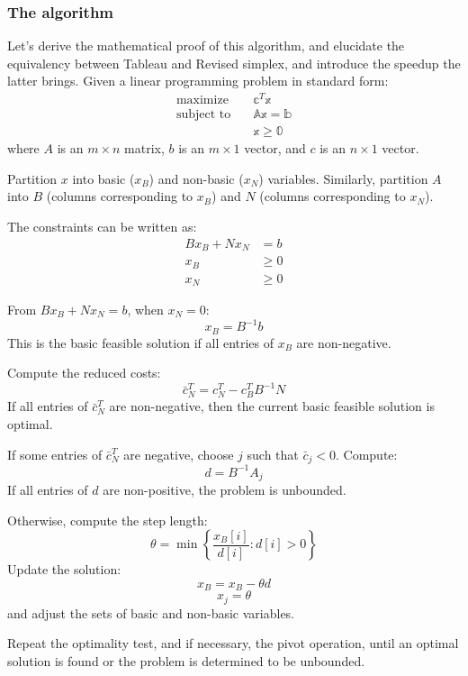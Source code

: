 \subsubsection*{The algorithm}
Let's derive the mathematical proof of this algorithm, and elucidate the
equivalency between Tableau and Revised simplex, and introduce the
speedup the latter brings.
Given a linear programming problem in standard form:
\begin{align*}
    \text{maximize} \quad   & \mathbb{c}^T \mathbb{x}    \\
    \text{subject to} \quad & \mathbb{A}\mathbb{x} = \mathbb{b}   \\
                            & \mathbb{x} \geq \mathbb{0}
\end{align*}
where \( A \) is an \( m \times n \) matrix,
\( b \) is an \( m \times 1 \) vector, and
\( c \) is an \( n \times 1 \) vector.


Partition \( x \) into basic (\( x_B \)) and non-basic (\( x_N \)) variables.
Similarly, partition \( A \) into \( B \) (columns corresponding to \( x_B \))
and \( N \) (columns corresponding to \( x_N \)).

The constraints can be written as:
\begin{align*}
    Bx_B + Nx_N & = b    \\
    x_B         & \geq 0 \\
    x_N         & \geq 0
\end{align*}

From \( Bx_B + Nx_N = b \), when \( x_N = 0 \):
\[ x_B = B^{-1}b \]
This is the basic feasible solution if all entries of \( x_B \) are non-negative.

Compute the reduced costs:
\[ \bar{c}_N^T = c_N^T - c_B^T B^{-1} N \]
If all entries of \( \bar{c}_N^T \) are non-negative,
then the current basic feasible solution is optimal.

If some entries of \( \bar{c}_N^T \) are negative,
choose \( j \) such that \( \bar{c}_j < 0 \). Compute:
\[ d = B^{-1} A_j \]
If all entries of \( d \) are non-positive, the problem is unbounded.

Otherwise, compute the step length:
\[ \theta = \min \left\{ \frac{x_B[i]}{d[i]} : d[i] > 0 \right\} \]
Update the solution:
\[ x_B = x_B - \theta d \]
\[ x_j = \theta \]
and adjust the sets of basic and non-basic variables.

Repeat the optimality test, and if necessary, the pivot operation,
until an optimal solution is found or the problem is determined to be unbounded.

